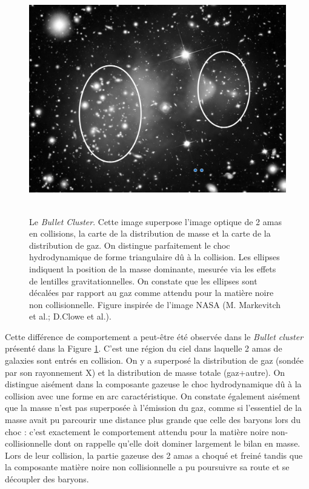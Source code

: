 \begin{figure}[htbp]
	\centering
		\includegraphics[height=10cm]{figs/bullet.png}
	\caption[Le \textit{Bullet Cluster}]{Le \textit{Bullet Cluster}. Cette image superpose l'image optique de 2 amas en collisions, la carte de la distribution de masse et la carte de la distribution de gaz. On distingue parfaitement le choc hydrodynamique de forme triangulaire dû à la collision. Les ellipses indiquent la position de la masse dominante, mesurée via les effets de lentilles gravitationnelles. On constate que les ellipses sont décalées par rapport au gaz comme attendu pour la matière noire non collisionnelle. Figure inspirée de l'image NASA (M. Markevitch et al.;  D.Clowe et al.).} 
	\label{f:bullet}
\end{figure}

Cette différence de comportement a peut-être été observée dans le \textit{Bullet cluster} présenté dans la Figure \ref{f:bullet}. C'est une région du ciel dans laquelle 2 amas de galaxies sont entrés en collision. On y a superposé la distribution de gaz (sondée par son rayonnement X) et la distribution de masse totale (gaz+autre). On distingue aisément dans la composante gazeuse le choc hydrodynamique dû à la collision avec une forme en arc caractéristique. On constate également aisément que la masse n'est pas superposée à l'émission du gaz, comme si l'essentiel de la masse avait pu parcourir une distance plus grande que celle des baryons lors du choc : c'est exactement le comportement attendu pour la matière noire non-collisionnelle dont on rappelle qu'elle doit dominer largement le bilan en masse. Lors de leur collision, la partie gazeuse des 2 amas a choqué et freiné tandis que la composante matière noire non collisionnelle a pu poursuivre sa route et se découpler des baryons. 

